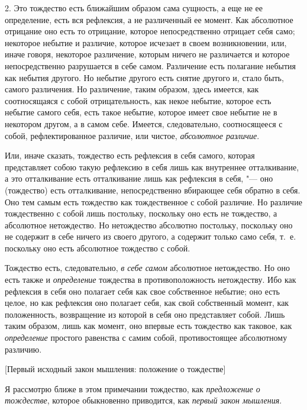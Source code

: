 2. Это тождество есть ближайшим образом сама сущность, а еще не ее
определение, есть вся рефлексия, а не различенный ее момент. Как абсолютное
отрицание оно есть то отрицание, которое непосредственно отрицает себя
само; некоторое небытие и различие, которое исчезает в своем возникновении,
или, иначе говоря, некоторое различение, которым ничего не различается и
которое непосредственно разрушается в себе самом. Различение есть полагание
небытия как небытия другого. Но небытие другого есть снятие другого и,
стало быть, самого различения. Но различение, таким образом, здесь имеется,
как соотносящаяся с собой отрицательность, как некое небытие, которое есть
небытие самого себя, есть такое небытие, которое имеет свое небытие не в
некотором другом, а в самом себе. Имеется, следовательно, соотносящееся с
собой, рефлектированное различие, или чистое,
{\em абсолютное различие}.

Или, иначе сказать, тождество есть рефлексия в себя самого, которая
представляет собою такую рефлексию в себя лишь как внутреннее отталкивание,
а это отталкивание есть отталкивание лишь как рефлексия в себя, "--- оно
(тождество) есть отталкивание, непосредственно вбирающее себя обратно в
себя. Оно тем самым есть тождество как тождественное с собой различие. Но
различие тождественно с собой лишь постольку, поскольку оно есть не
тождество, а абсолютное нетождество. Но нетождество абсолютно постольку,
поскольку оно не содержит в себе ничего из своего другого, а содержит
только само себя, т.~е. поскольку оно есть абсолютное тождество с собой.

Тождество есть, следовательно, {\em в себе самом}
абсолютное нетождество. Но оно есть также и
{\em определение} тождества в противоположность
нетождеству. Ибо как рефлексия в себя оно полагает себя как свое
собственное небытие; оно есть целое, но как рефлексия оно полагает себя,
как свой собственный момент, как положенность, возвращение из которой в
себя оно представляет собой. Лишь таким образом, лишь как момент, оно
впервые есть тождество как таковое, как
{\em определение} простого равенства с самим собой,
противостоящее абсолютному различию.

%
  {[Первый исходный закон мышления: положение о тождестве]}

Я рассмотрю ближе в этом примечании тождество, как {\em предложение о
тождестве}, которое обыкновенно приводится, как {\em первый закон мышления}.


